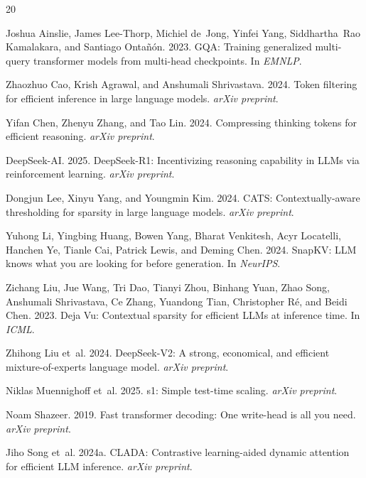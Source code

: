 \documentclass[11pt,a4paper]{article}
\begin{document}
\begin{thebibliography}{20}

Joshua Ainslie, James Lee-Thorp, Michiel de~Jong, Yinfei Yang, Siddhartha~Rao Kamalakara, and Santiago Onta\~{n}\'{o}n. 2023.
GQA: Training generalized multi-query transformer models from multi-head checkpoints.
In \emph{EMNLP}.

Zhaozhuo Cao, Krish Agrawal, and Anshumali Shrivastava. 2024.
Token filtering for efficient inference in large language models.
\emph{arXiv preprint}.

Yifan Chen, Zhenyu Zhang, and Tao Lin. 2024.
Compressing thinking tokens for efficient reasoning.
\emph{arXiv preprint}.

DeepSeek-AI. 2025.
DeepSeek-R1: Incentivizing reasoning capability in LLMs via reinforcement learning.
\emph{arXiv preprint}.

Dongjun Lee, Xinyu Yang, and Youngmin Kim. 2024.
CATS: Contextually-aware thresholding for sparsity in large language models.
\emph{arXiv preprint}.

Yuhong Li, Yingbing Huang, Bowen Yang, Bharat Venkitesh, Acyr Locatelli, Hanchen Ye, Tianle Cai, Patrick Lewis, and Deming Chen. 2024.
SnapKV: LLM knows what you are looking for before generation.
In \emph{NeurIPS}.

Zichang Liu, Jue Wang, Tri Dao, Tianyi Zhou, Binhang Yuan, Zhao Song, Anshumali Shrivastava, Ce Zhang, Yuandong Tian, Christopher R\'{e}, and Beidi Chen. 2023.
Deja Vu: Contextual sparsity for efficient LLMs at inference time.
In \emph{ICML}.

Zhihong Liu et~al. 2024.
DeepSeek-V2: A strong, economical, and efficient mixture-of-experts language model.
\emph{arXiv preprint}.

Niklas Muennighoff et~al. 2025.
s1: Simple test-time scaling.
\emph{arXiv preprint}.

Noam Shazeer. 2019.
Fast transformer decoding: One write-head is all you need.
\emph{arXiv preprint}.

Jiho Song et~al. 2024a.
CLADA: Contrastive learning-aided dynamic attention for efficient LLM inference.
\emph{arXiv preprint}.


\end{thebibliography}
\end{document}
